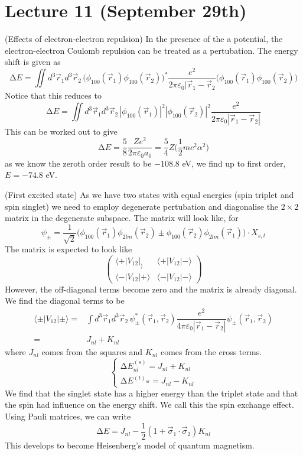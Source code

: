 \section{Lecture 11 (September 29th)}
\begin{ex}
(Effects of electron-electron repulsion) In the presence of the a potential, the electron-electron Coulomb repulsion can be treated as a pertubation. The energy shift is given as
\[\mathrm{\Delta }E=\iint d^3\vec{r}_{1}d^3\vec{r}_{2}\,\Big(\phi _{100}(\vec{r}_{1})\phi _{100}(\vec{r}_{2})\Big)^{*}\dfrac{e^2}{2\pi \varepsilon_0|\vec{r}_{1}-\vec{r}_{2}}\Big(\phi _{100}(\vec{r}_{1})\phi _{100}(\vec{r}_{2})\Big)\]
Notice that this reduces to
\[\mathrm{\Delta }E=\iint d^3\vec{r}_{1}d^3\vec{r}_{2}\,|\phi _{100}(\vec{r}_{1})|^2|\phi _{100}(\vec{r}_{2})|^2\dfrac{e^2}{2\pi \varepsilon _{0}|\vec{r}_{1}-\vec{r}_{2}|}\]
This can be worked out to give
\[\mathrm{\Delta }E=\dfrac{5}{8}\dfrac{Ze^2}{2\pi \varepsilon_0a_0}=\dfrac{5}{4}Z\Big(\dfrac{1}{2}mc^2\alpha ^2\Big)\]
as we know the zeroth order result to be $-108.8$ eV, we find up to first order, $E=-74.8$ eV.
\end{ex}
\vspace{2ex}
\begin{ex}
(First excited state) As we have two states with equal energies (spin triplet and spin singlet) we need to employ degenerate pertubation and diagonalise the $2\times 2$ matrix in the degenerate subspace. The matrix will look like, for
\[\psi _{\pm}=\dfrac{1}{\sqrt{2}}\Big(\phi _{100}(\vec{r}_{1})\phi _{2lm}(\vec{r}_{2})\pm \phi _{100}(\vec{r}_{2})\phi _{2lm}(\vec{r}_{1})\Big)\cdot X_{s,t}\]
The matrix is expected to look like
\[\begin{pmatrix}
\langle +|V_{12}|_{\rangle }&\langle +|V_{12}|-\rangle \\
\langle -|V_{12}|+\rangle &\langle -|V_{12}|-\rangle 
\end{pmatrix}
\]
However, the off-diagonal terms become zero and the matrix is already diagonal. We find the diagonal terms to be
\[\begin{align*}
\langle \pm |V_{12}|\pm\rangle =&\int d^3\vec{r}_{1}d^3\vec{r}_{2}\,\psi _{\pm}^{*}(\vec{r}_{1},\vec{r}_{2})\dfrac{e^2}{4\pi \varepsilon _{0}|\vec{r}_{1}-\vec{r}_{2}|}\psi _{\pm}(\vec{r}_{1},\vec{r}_{2})\\
=&J_{nl}+K_{nl}
\end{align*}\]
where $J_{nl}$ comes from the squares and $K_{nl}$ comes from the cross terms. 
\[\begin{cases}
\mathrm{\Delta }E^{(s)}_{nl}=J_{nl}+K_{nl}\\
\mathrm{\Delta }E^{(t)_{nl}}=J_{nl}-K_{nl}
\end{cases}\]
We find that the singlet state has a higher energy than the triplet state and that the spin had influence on the energy shift. We call this the spin exchange effect. Using Pauli matrices, we can write
\[\mathrm{\Delta }E=J_{nl}-\dfrac{1}{2}(1+\vec{\sigma }_{1}\cdot \vec{\sigma }_{2})K_{nl}\]
This develops to become Heisenberg's model of quantum magnetism. 
\end{ex}
